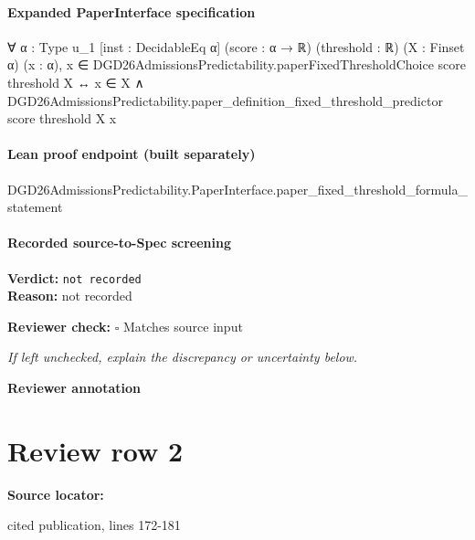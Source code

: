\documentclass[10pt]{article}
\newcommand{\reviewerbox}{%
  \par\noindent\fbox{\parbox{0.96\linewidth}{\rule{0pt}{0.38in}}}\par
}
\newcommand{\reviewmatch}[1]{%
  \par\noindent\textbf{Reviewer check:} $\square$\; #1\par
  \noindent\emph{If left unchecked, explain the discrepancy or uncertainty below.}\par
}
\begin{document}
\paragraph{Expanded PaperInterface specification}
\begin{ReviewVerbatim}
∀ {α : Type u_1} [inst : DecidableEq α] (score : α → ℝ) (threshold : ℝ) (X : Finset α) (x : α),
  x ∈ DGD26AdmissionsPredictability.paperFixedThresholdChoice score threshold X ↔
    x ∈ X ∧ DGD26AdmissionsPredictability.paper_definition_fixed_threshold_predictor score threshold X x
\end{ReviewVerbatim}

\paragraph{Lean proof endpoint (built separately)}\begin{ReviewVerbatim}
DGD26AdmissionsPredictability.PaperInterface.paper_fixed_threshold_formula_statement
\end{ReviewVerbatim}

\paragraph{Recorded source-to-Spec screening}
\textbf{Verdict:} \texttt{not recorded}
\\
\textbf{Reason:} not recorded
\reviewmatch{Matches source input}
\noindent\textbf{Reviewer annotation}\par
\reviewerbox
\clearpage
\hypertarget{source-claim-685dcba90250bf7c}{}
\section*{Review row 2}
\textbf{Source locator:} {\footnotesize\raggedright cited publication, lines 172-\allowbreak{}181\par}
\end{document}
